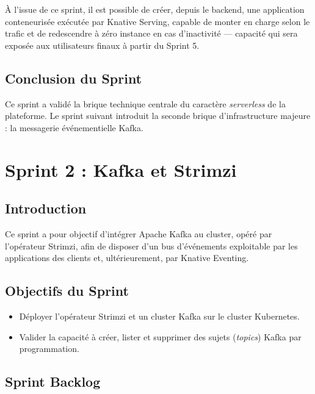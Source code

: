 À l'issue de ce sprint, il est possible de créer, depuis le backend, une application conteneurisée exécutée par Knative Serving, capable de monter en charge selon le trafic et de redescendre à zéro instance en cas d'inactivité — capacité qui sera exposée aux utilisateurs finaux à partir du Sprint 5.

\subsection{Conclusion du Sprint}

Ce sprint a validé la brique technique centrale du caractère \textit{serverless} de la plateforme. Le sprint suivant introduit la seconde brique d'infrastructure majeure : la messagerie événementielle Kafka.


\section{Sprint 2 : Kafka et Strimzi}

\subsection{Introduction}

Ce sprint a pour objectif d'intégrer Apache Kafka au cluster, opéré par l'opérateur Strimzi, afin de disposer d'un bus d'événements exploitable par les applications des clients et, ultérieurement, par Knative Eventing.

\subsection{Objectifs du Sprint}

\begin{itemize}
    \item Déployer l'opérateur Strimzi et un cluster Kafka sur le cluster Kubernetes.
    \item Valider la capacité à créer, lister et supprimer des sujets (\textit{topics}) Kafka par programmation.
\end{itemize}

\subsection{Sprint Backlog}

